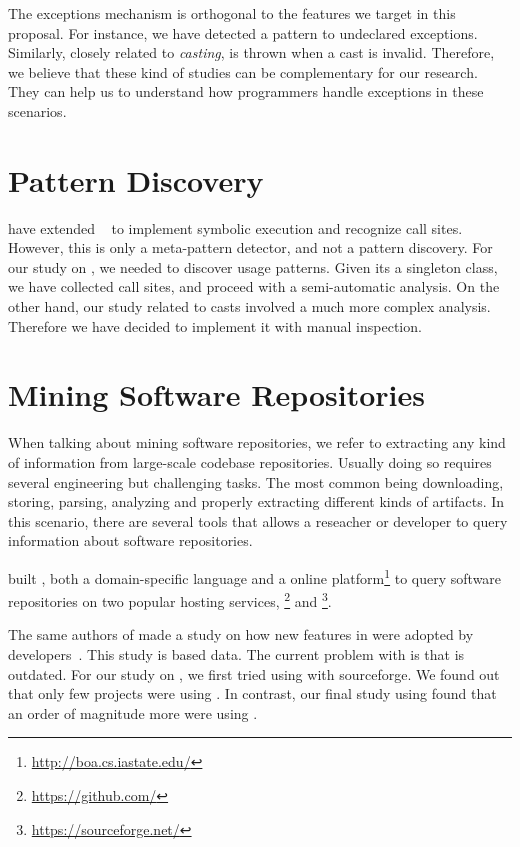 The exceptions mechanism is orthogonal to the features we target in this proposal.
For instance, we have detected a \smu{} pattern to \throw{} undeclared exceptions.
Similarly, closely related to \emph{casting}, \cce{} is thrown when a cast is invalid.
Therefore, we believe that these kind of studies can be complementary for our research. They can help us to understand how programmers handle exceptions in these scenarios.


\section{Pattern Discovery}

\cite{5463349} have extended \asm{}~\cite{Bruneton02asm:a,Kuleshov07} to implement symbolic execution and recognize call sites.
However, this is only a meta-pattern detector, and not a pattern discovery.
For our study on \smu{}, we needed to discover usage patterns.
Given its a singleton class, we have collected call sites,
and proceed with a semi-automatic analysis.
On the other hand, our study related to casts involved a much more complex analysis.
Therefore we have decided to implement it with manual inspection.

\section{Mining Software Repositories}

When talking about mining software repositories, we refer to extracting any kind of information from large-scale codebase repositories.
Usually doing so requires several engineering but challenging tasks.
The most common being downloading, storing, parsing, analyzing and properly extracting different kinds of artifacts.
In this scenario, there are several tools that allows a reseacher or developer to query information about software repositories.

\cite{Dyer-Nguyen-Rajan-Nguyen-13, Dyer-Rajan-Nguyen-13} built \boa{}, both a domain-specific language and a online platform\footnote{\url{http://boa.cs.iastate.edu/}} to query software repositories on two popular hosting services, \github{}\footnote{\url{https://github.com/}} and \sourceforge{}\footnote{\url{https://sourceforge.net/}}.

The same authors of \boa{} made a study on how new features in \java{} were adopted by developers~\cite{Dyer-Rajan-Nguyen-Nguyen-14}.
This study is based \sourceforge{} data.
The current problem with \sourceforge{} is that is outdated.
For our study on \smu{}, we first tried using \boa{} with sourceforge{}.
We found out that only few projects were using \smu{}.
In contrast, our final study using \maven{} found that an order of magnitude more were using \smu{}.

